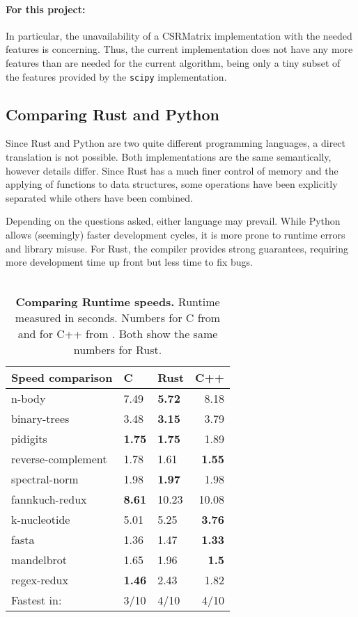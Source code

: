 \paragraph{For this project:} In particular, the unavailability of a CSRMatrix
implementation with the needed features is concerning. Thus, the current
implementation does not have any more features than are needed for the current
algorithm, being only a tiny subset of the features provided by the
\verb|scipy| implementation.


\newpage
\subsection{Comparing Rust and Python}\label{sec:rustvspython}

Since Rust and Python are two quite different programming languages, a direct
translation is not possible. Both implementations are the same semantically,
however details differ. Since Rust has a much finer control of memory and the
applying of functions to data structures, some operations have been explicitly
separated while others have been combined.

Depending on the questions asked, either language may prevail. While Python
allows (seemingly) faster development cycles, it is more prone to runtime
errors and library misuse. For Rust, the compiler provides strong guarantees,
requiring more development time up front but less time to fix bugs. \\ \\


\begin{table}[htb]
\begin{tabular}{@{}lllr@{}}
    \textbf{Speed comparison} & C & Rust & C++ \\ \midrule
    n-body & 7.49 & \textbf{5.72} & 8.18 \\
    binary-trees & 3.48 & \textbf{3.15} & 3.79 \\
    pidigits & \textbf{1.75} & \textbf{1.75} & 1.89 \\
    reverse-complement & 1.78 & 1.61 & \textbf{1.55} \\
    spectral-norm & 1.98 & \textbf{1.97} & 1.98 \\
    fannkuch-redux & \textbf{8.61} & 10.23 & 10.08 \\
    k-nucleotide & 5.01 & 5.25 & \textbf{3.76} \\
    fasta & 1.36 & 1.47 & \textbf{1.33} \\
    mandelbrot & 1.65 & 1.96 & \textbf{1.5} \\
    regex-redux & \textbf{1.46} & 2.43 & 1.82 \\ \midrule
    Fastest in: & 3/10 & 4/10 & 4/10 \\
\end{tabular}
    \caption[Runtime Comparison Between Rust/C/C++]{\textbf{Comparing Runtime speeds.} Runtime measured in seconds. Numbers for C from \cite{benchc} and for C++ from \cite{benchcpp}. Both show the same numbers for Rust.}
    \label{tab:runtime}
\end{table}

